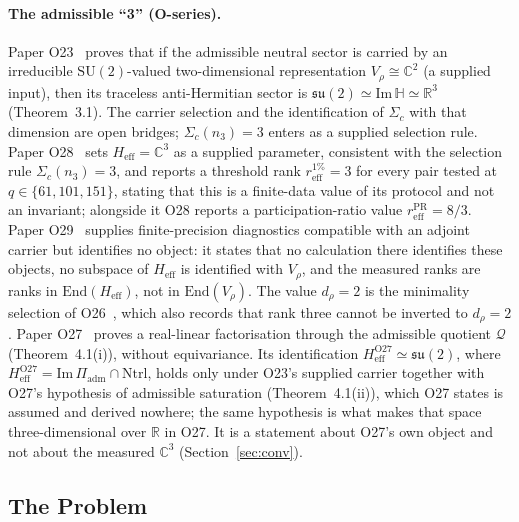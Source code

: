 \documentclass[11pt,a4paper]{article}
\newcommand{\Heff}{H_{\mathrm{eff}}}
\newcommand{\ImH}{\mathrm{Im}\,\mathbb{H}}
\newcommand{\su}{\mathfrak{su}}
\newcommand{\Vr}{V_\rho}
\begin{document}
      \paragraph{The admissible ``3'' (O-series).}
        Paper O23~\cite{Beau2026a27} proves that if the admissible neutral sector is carried by an
        irreducible $\mathrm{SU}(2)$-valued two-dimensional representation
        $V_\rho \cong \mathbb{C}^2$ (a supplied input), then its traceless anti-Hermitian sector is
        $\su(2) \simeq \ImH \simeq \mathbb{R}^3$ (Theorem~3.1).
        The carrier selection and the identification of $\Sigma_c$ with that dimension are open
        bridges; $\Sigma_c(n_3) = 3$ enters as a supplied selection rule.
        Paper O28~\cite{Beau2026a32} sets $\Heff = \mathbb{C}^3$ as a supplied parameter,
        consistent with the selection rule $\Sigma_c(n_3) = 3$, and reports a threshold rank
        $r_{\mathrm{eff}}^{1\%} = 3$ for every pair tested at $q \in \{61, 101, 151\}$, stating
        that this is a finite-data value of its protocol and not an invariant; alongside it O28
        reports a participation-ratio value $r_{\mathrm{eff}}^{\mathrm{PR}} = 8/3$.
        Paper O29~\cite{Beau2026a33} supplies finite-precision diagnostics compatible with an
        adjoint carrier but identifies no object: it states that no calculation there identifies
        these objects, no subspace of $\Heff$ is identified with $\Vr$, and the measured ranks are
        ranks in $\mathrm{End}(\Heff)$, not in $\mathrm{End}(\Vr)$.
        The value $d_\rho = 2$ is the minimality selection of O26~\cite{Beau2026a30}, which also
        records that rank three cannot be inverted to $d_\rho = 2$.
        Paper O27~\cite{Beau2026a31} proves a real-linear factorisation through the admissible
        quotient $\mathcal{Q}$ (Theorem~4.1(i)), without equivariance.
        Its identification $H_{\mathrm{eff}}^{\text{O27}} \simeq \su(2)$, where
        $H_{\mathrm{eff}}^{\text{O27}} = \mathrm{Im}\,\Pi_{\mathrm{adm}} \cap \mathrm{Ntrl}$,
        holds only under O23's supplied carrier together with O27's hypothesis of admissible
        saturation (Theorem~4.1(ii)), which O27 states is assumed and derived nowhere; the same
        hypothesis is what makes that space three-dimensional over $\mathbb{R}$ in O27.
        It is a statement about O27's own object and not about the measured $\mathbb{C}^3$
        (Section~\ref{sec:conv}).

  \subsection{The Problem}
\end{document}
